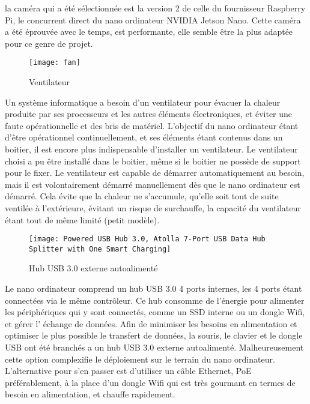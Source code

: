 \par la caméra qui a été sélectionnée est la version 2 de celle du fournisseur Raspberry Pi, le concurrent direct du nano ordinateur NVIDIA Jetson Nano. Cette caméra a été éprouvée avec le temps, est performante, elle semble être la plus adaptée pour ce genre de projet. 
\begin{figure}[H]
    \centering
    \texttt{[image: fan]}
    \caption{Ventilateur}
    \label{fig:fan}
\end{figure}
\par Un système informatique a besoin d'un ventilateur pour évacuer la chaleur produite par ses processeurs et les autres éléments électroniques, et éviter une faute opérationnelle et des bris de matériel. L'objectif du nano ordinateur étant d'être opérationnel continuellement, et ses éléments étant contenus dans un boitier, il est encore plus indispensable d'installer un ventilateur. Le ventilateur choisi a pu être installé dans le boitier, même si le boitier ne possède de support pour le fixer. Le ventilateur est capable de démarrer automatiquement au besoin, mais il est volontairement démarré manuellement dès que le nano ordinateur est démarré. Cela évite que la chaleur ne s'accumule, qu'elle soit tout de suite ventilée à l'extérieure, évitant un risque de surchauffe, la capacité du ventilateur étant tout de même limité (petit modèle).
\begin{figure}[H]
    \centering
    \texttt{[image: Powered USB Hub 3.0, Atolla 7-Port USB Data Hub Splitter with One Smart Charging]}
    \caption{Hub USB 3.0 externe autoalimenté}
    \label{fig:hubusb}
\end{figure}
\par Le nano ordinateur comprend un hub USB 3.0 4 ports internes, les 4 ports étant connectées via le même contrôleur. Ce hub consomme de l'énergie pour alimenter les périphériques qui y sont connectés, comme un SSD interne ou un dongle Wifi, et gérer l’ échange de données. Afin de minimiser les besoins en alimentation et optimiser le plus possible le transfert de données, la souris, le clavier et le dongle USB ont été branchés a un hub USB 3.0 externe autoalimenté. Malheureusement cette option complexifie le déploiement sur le terrain du nano ordinateur. L'alternative pour s'en passer est d'utiliser un câble Ethernet, PoE préférablement, à la place d'un dongle Wifi qui est très gourmant en termes de besoin en alimentation, et chauffe rapidement.
